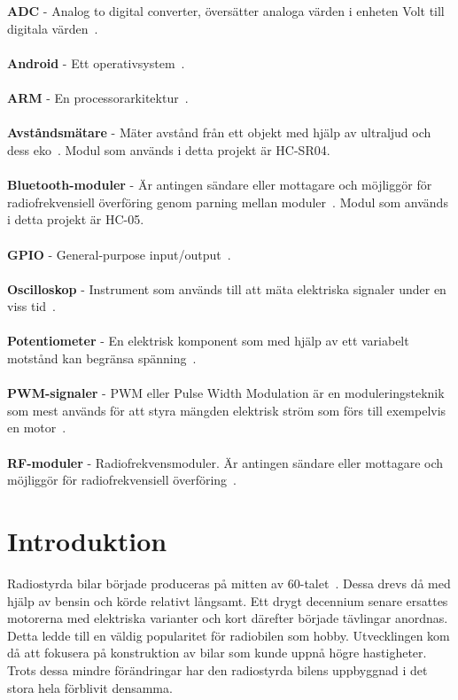 \documentclass[a4paper]{article}
\begin{document}
\newpage
{}
\\\\
{\bf ADC} - Analog to digital converter, översätter analoga värden i enheten Volt till digitala värden~\cite{ADC}.
\\\\
{\bf Android} - Ett operativsystem~\cite{Android}.
\\\\
{\bf ARM} - En processorarkitektur~\cite{chalmersARM}.
\\\\
{\bf Avståndsmätare} - Mäter avstånd från ett objekt med hjälp av ultraljud och dess eko~\cite{DistMeasure}. Modul som används i detta projekt är HC-SR04.
\\\\
{\bf Bluetooth-moduler} - Är antingen sändare eller mottagare och möjliggör för radiofrekvensiell överföring genom parning mellan moduler~\cite{Bluetooth}. Modul som används i detta projekt är HC-05.
\\\\
{\bf GPIO} - General-purpose input/output~\cite{chalmersARM}.
\\\\
{\bf Oscilloskop} - Instrument som används till att mäta elektriska signaler under en viss tid~\cite{oscilloscope}.
\\\\
{\bf Potentiometer} - En elektrisk komponent som med hjälp av ett variabelt motstånd kan begränsa spänning~\cite{Potentiometer}.
\\\\
{\bf PWM-signaler} - PWM eller Pulse Width Modulation är en moduleringsteknik som mest används för att styra mängden elektrisk ström som förs till exempelvis en motor~\cite{PWM}.
\\\\
{\bf RF-moduler} - Radiofrekvensmoduler. Är antingen sändare eller mottagare och möjliggör för radiofrekvensiell överföring~\cite{RFModule}.





\newpage
\section{Introduktion}
Radiostyrda bilar började produceras på mitten av 60-talet~\cite{RCHistory}. Dessa drevs då med hjälp av bensin och körde relativt långsamt. Ett drygt decennium senare ersattes motorerna med elektriska varianter och kort därefter började tävlingar anordnas. Detta ledde till en väldig popularitet för radiobilen som hobby. Utvecklingen kom då att fokusera på konstruktion av bilar som kunde uppnå högre hastigheter. Trots dessa mindre förändringar har den radiostyrda bilens uppbyggnad i det stora hela förblivit densamma.
\end{document}
